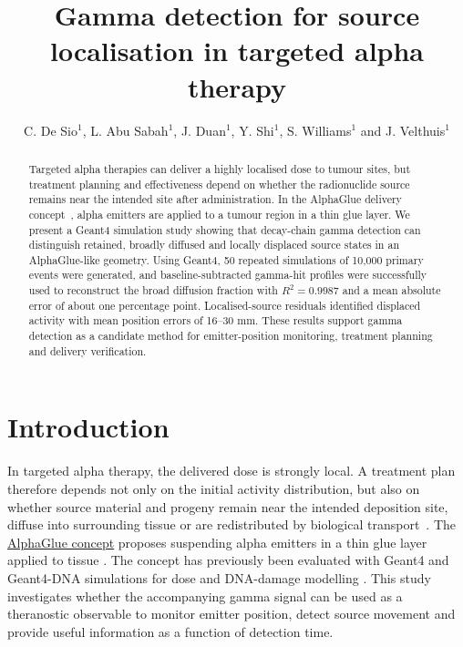 \documentclass{iopconfser}
\begin{document}
\title{Gamma detection for source localisation in targeted alpha therapy}

\author{C. De Sio$^{1}$, L. Abu Sabah$^{1}$, J. Duan$^{1}$, Y. Shi$^{1}$,
S. Williams$^{1}$ and J. Velthuis$^{1}$}


\begin{abstract}
Targeted alpha therapies can deliver a highly localised dose to tumour sites, but treatment
planning and effectiveness depend on whether the radionuclide source remains near
the intended site after administration. In the AlphaGlue delivery concept~\cite{AlphaGlue2025},
alpha emitters are applied to a tumour region in a thin glue layer. We present
a Geant4 simulation study showing that decay-chain gamma detection can
distinguish retained, broadly diffused and locally displaced source states in
an AlphaGlue-like geometry. Using Geant4, 50 repeated simulations of 10,000 primary events were generated, and
baseline-subtracted gamma-hit profiles were successfully used to reconstruct the broad diffusion
fraction with $R^2=0.9987$ and a mean absolute error of about one percentage
point. Localised-source residuals identified displaced activity with mean
position errors of 16--30 mm. These results support gamma detection as a
candidate method for emitter-position monitoring, treatment planning and
delivery verification.
\end{abstract}

\section{Introduction}

In targeted alpha therapy, the delivered dose is strongly local. A treatment
plan therefore depends not only on the initial activity distribution, but also
on whether source material and progeny remain near the intended deposition
site, diffuse into surrounding tissue or are redistributed by biological
transport~\cite{laura,heger}. The
\href{https://doi.org/10.3390/biomedinformatics5040058}{AlphaGlue concept}
proposes suspending alpha emitters in a thin glue layer applied to tissue
\cite{AlphaGlue2025}. The concept has previously been evaluated with Geant4
and Geant4-DNA simulations for dose and DNA-damage modelling
\cite{Geant4,Geant4DNA}. This study investigates whether the accompanying
gamma signal can be used as a theranostic observable to monitor emitter
position, detect source movement and provide useful information as a function
of detection time.
\end{document}
